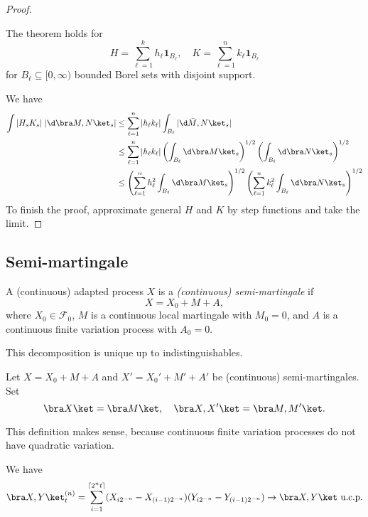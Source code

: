 \documentclass[a4paper]{article}
\begin{document}
\begin{proof}
  \begin{claim}
    The theorem holds for
    \[
      H = \sum_{\ell = 1}^k h_\ell \mathbf{1}_{B_\ell},\quad K = \sum_{\ell = 1}^n k_\ell \mathbf{1}_{B_\ell}
    \]
    for $B_\ell \subseteq [0, \infty)$ bounded Borel sets with disjoint support.
  \end{claim}
  We have
  \begin{align*}
    \int |H_s K_s| \;|\d \bra M, N\ket_s| &\leq \sum_{\ell = 1}^n |h_\ell k_\ell| \int_{B_\ell} |\d \bar M, N\ket_s|\\
    &\leq \sum_{\ell = 1}^n |h_\ell k_\ell| \left(\int_{B_\ell} \d \bra M\ket_s\right)^{1/2} \left(\int_{B_\ell} \d \bra N\ket_s\right)^{1/2}\\
    &\leq \left(\sum_{\ell = 1}^n h_\ell^2 \int_{B_\ell} \d \bra M\ket_s\right)^{1/2} \left(\sum_{\ell = 1}^n k_\ell^2 \int_{B_\ell} \d \bra N\ket_s\right)^{1/2}
  \end{align*}
  To finish the proof, approximate general $H$ and $K$ by step functions and take the limit.
\end{proof}

\subsection{Semi-martingale}
\begin{defi}
  A (continuous) adapted process $X$ is a \emph{(continuous) semi-martingale} if
  \[
    X = X_0 + M + A,
  \]
  where $X_0 \in \mathcal{F}_0$, $M$ is a continuous local martingale with $M_0 = 0$, and $A$ is a continuous finite variation process with $A_0 = 0$.
\end{defi}
This decomposition is unique up to indistinguishables.

\begin{defi}
  Let $X = X_0 + M + A$ and $X' = X_0' + M' + A'$ be (continuous) semi-martingales. Set
  \[
    \bra X\ket = \bra M\ket, \quad \bra X, X'\ket = \bra M, M'\ket.
  \]
\end{defi}

This definition makes sense, because continuous finite variation processes do not have quadratic variation.

\begin{ex}
  We have
  \[
    \bra X, Y\ket_t^{(n)} = \sum_{i = 1}^{\lceil 2^n t\rceil} (X_{i 2^{-n}} - X_{(i - 1)2^{-n}})(Y_{i2^{-n}} - Y_{(i - 1)2^{-n}}) \to \bra X, Y\ket\text{ u.c.p.}
  \]
\end{ex}
\end{document}
